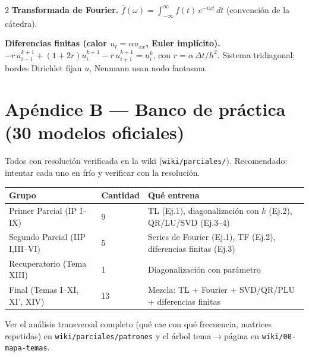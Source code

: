 \begin{multicols}{2}
\smallskip
\textbf{Transformada de Fourier.} $\hat f(\omega)=\displaystyle\int_{-\infty}^{\infty} f(t)\,e^{-i\omega t}\,dt$ (convención de la cátedra).

\smallskip
\textbf{Diferencias finitas (calor $u_t=\alpha u_{xx}$, Euler implícito).}
$-r\,u_{i-1}^{k+1}+(1+2r)u_i^{k+1}-r\,u_{i+1}^{k+1}=u_i^{k}$, con $r=\alpha\,\Delta t/h^2$. Sistema tridiagonal; bordes Dirichlet fijan $u$, Neumann usan nodo fantasma.
\end{multicols}

\newpage
\section{Apéndice B — Banco de práctica (30 modelos oficiales)}

Todos con resolución verificada en la wiki (\texttt{wiki/parciales/}). Recomendado: intentar cada uno en frío y verificar con la resolución.

\begin{center}\small
\begin{tabular}{@{}lll@{}}
\toprule
Grupo & Cantidad & Qué entrena \\
\midrule
Primer Parcial (IP I–IX) & 9 & TL (Ej.1), diagonalización con $k$ (Ej.2), QR/LU/SVD (Ej.3–4) \\
Segundo Parcial (IIP I,III–VI) & 5 & Series de Fourier (Ej.1), TF (Ej.2), diferencias finitas (Ej.3) \\
Recuperatorio (Tema XIII) & 1 & Diagonalización con parámetro \\
Final (Temas I–XI, XI', XIV) & 13 & Mezcla: TL + Fourier + SVD/QR/PLU + diferencias finitas \\
\bottomrule
\end{tabular}
\end{center}

\noindent Ver el análisis transversal completo (qué cae con qué frecuencia, matrices repetidas) en \texttt{wiki/parciales/patrones} y el árbol tema$\to$página en \texttt{wiki/00-mapa-temas}.

